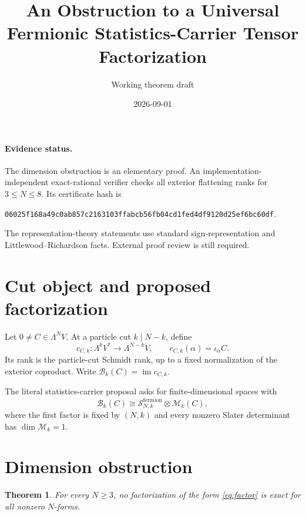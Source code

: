 \documentclass[11pt]{article}
\title{An Obstruction to a Universal Fermionic Statistics-Carrier Tensor Factorization}
\author{Working theorem draft}
\date{2026-09-01}
\newtheorem{theorem}{Theorem}
\newcommand{\im}{\operatorname{im}}
\begin{document}
\maketitle

\paragraph{Evidence status.}
The dimension obstruction is an elementary proof. An implementation-independent
exact-rational verifier checks all exterior flattening ranks for
$3\le N\le8$. Its certificate hash is
\begin{center}
\small\texttt{06025f168a49c0ab857c2163103ffabcb56fb04cd1fed4df9120d25ef6bc60df}.
\end{center}
The representation-theory statements use standard sign-representation and
Littlewood--Richardson facts. External proof review is still required.

\section{Cut object and proposed factorization}

Let $0\ne C\in\Lambda^N V$. At a particle cut $k\mid N-k$, define
\[
 c_{C,k}:\Lambda^kV^*\longrightarrow\Lambda^{N-k}V,
 \qquad c_{C,k}(\alpha)=\iota_\alpha C.
\]
Its rank is the particle-cut Schmidt rank, up to a fixed normalization of the
exterior coproduct. Write $\mathcal B_k(C)=\im c_{C,k}$.

The literal statistics-carrier proposal asks for finite-dimensional spaces
with
\begin{equation}
 \mathcal B_k(C)\cong
 \mathcal S^{\mathrm{fermion}}_{N,k}\otimes\mathcal M_k(C),
 \label{eq:factor}
\end{equation}
where the first factor is fixed by $(N,k)$ and every nonzero Slater determinant
has $\dim\mathcal M_k=1$.

\section{Dimension obstruction}

\begin{theorem}
For every $N\ge3$, no factorization of the form \eqref{eq:factor} is exact for
all nonzero $N$-forms.
\end{theorem}
\end{document}
